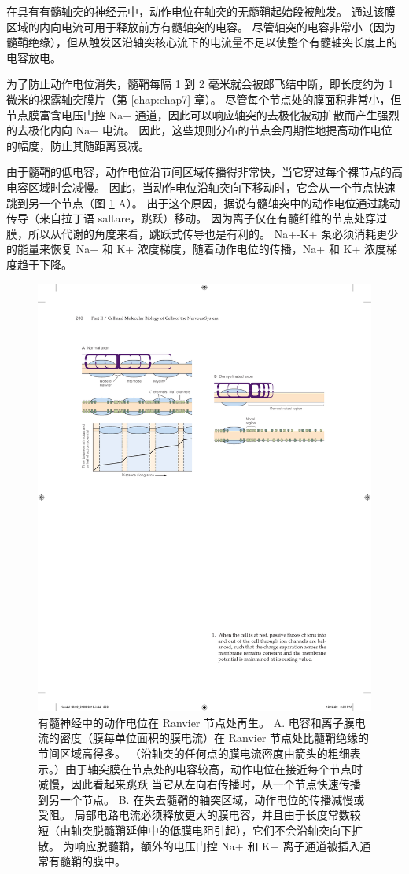 在具有有髓轴突的神经元中，动作电位在轴突的无髓鞘起始段被触发。 
通过该膜区域的内向电流可用于释放前方有髓轴突的电容。 
尽管轴突的电容非常小（因为髓鞘绝缘），但从触发区沿轴突核心流下的电流量不足以使整个有髓轴突长度上的电容放电。


为了防止动作电位消失，髓鞘每隔 1 到 2 毫米就会被郎飞结中断，即长度约为 1 微米的裸露轴突膜片（第 \ref{chap:chap7} 章）。 
尽管每个节点处的膜面积非常小，但节点膜富含电压门控 Na+ 通道，因此可以响应轴突的去极化被动扩散而产生强烈的去极化内向 Na+ 电流。 
因此，这些规则分布的节点会周期性地提高动作电位的幅度，防止其随距离衰减。


由于髓鞘的低电容，动作电位沿节间区域传播得非常快，当它穿过每个裸节点的高电容区域时会减慢。 
因此，当动作电位沿轴突向下移动时，它会从一个节点快速跳到另一个节点（图 \ref{fig:9_13} A）。 
出于这个原因，据说有髓轴突中的动作电位通过跳动传导（来自拉丁语 saltare，跳跃）移动。 
因为离子仅在有髓纤维的节点处穿过膜，所以从代谢的角度来看，跳跃式传导也是有利的。 
Na+-K+ 泵必须消耗更少的能量来恢复 Na+ 和 K+ 浓度梯度，随着动作电位的传播，Na+ 和 K+ 浓度梯度趋于下降。

\begin{figure}[htbp]
	\centering
	\includegraphics[width=0.5\linewidth]{chap09/fig_9_13}
	\caption{有髓神经中的动作电位在 Ranvier 节点处再生。 A. 电容和离子膜电流的密度（膜每单位面积的膜电流）在 Ranvier 节点处比髓鞘绝缘的节间区域高得多。 （沿轴突的任何点的膜电流密度由箭头的粗细表示。）由于轴突膜在节点处的电容较高，动作电位在接近每个节点时减慢，因此看起来跳跃 当它从左向右传播时，从一个节点快速传播到另一个节点。 B. 在失去髓鞘的轴突区域，动作电位的传播减慢或受阻。 局部电路电流必须释放更大的膜电容，并且由于长度常数较短（由轴突脱髓鞘延伸中的低膜电阻引起），它们不会沿轴突向下扩散。 为响应脱髓鞘，额外的电压门控 Na+ 和 K+ 离子通道被插入通常有髓鞘的膜中。}
	\label{fig:9_13}
\end{figure}


